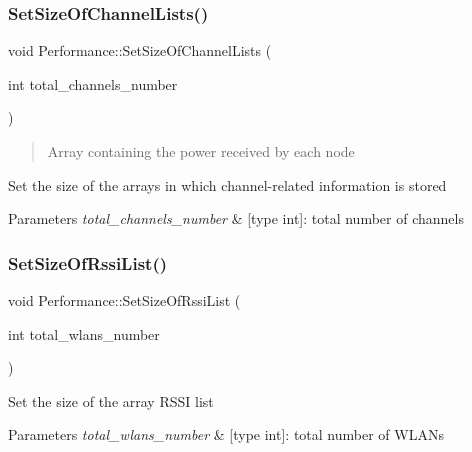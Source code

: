 \subsubsection{\texorpdfstring{Set\+Size\+Of\+Channel\+Lists()}{SetSizeOfChannelLists()}}
{\footnotesize\ttfamily void Performance\+::\+Set\+Size\+Of\+Channel\+Lists (\begin{DoxyParamCaption}\item[{int}]{total\+\_\+channels\+\_\+number }\end{DoxyParamCaption})\hspace{0.3cm}{\ttfamily [inline]}}



\begin{quote}
Array containing the power received by each node \end{quote}


Set the size of the arrays in which channel-\/related information is stored 
\begin{DoxyParams}{Parameters}
{\em total\+\_\+channels\+\_\+number} & \mbox{[}type int\mbox{]}\+: total number of channels \\
\hline
\end{DoxyParams}
\mbox{\label{structPerformance_afed78fdc35bd07dd576a5235389f15ed}} 
\subsubsection{\texorpdfstring{Set\+Size\+Of\+Rssi\+List()}{SetSizeOfRssiList()}}
{\footnotesize\ttfamily void Performance\+::\+Set\+Size\+Of\+Rssi\+List (\begin{DoxyParamCaption}\item[{int}]{total\+\_\+wlans\+\_\+number }\end{DoxyParamCaption})\hspace{0.3cm}{\ttfamily [inline]}}

Set the size of the array R\+S\+SI list 
\begin{DoxyParams}{Parameters}
{\em total\+\_\+wlans\+\_\+number} & \mbox{[}type int\mbox{]}\+: total number of W\+L\+A\+Ns \\
\hline
\end{DoxyParams}
\mbox{\label{structPerformance_a4478d24cc24761d24a8bb0d628c8664e}} 
